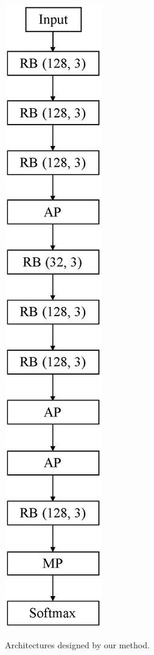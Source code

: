 \begin{figure}[!t]
\begin{minipage}[b]{0.45\linewidth}
  \label{modelA}
 \end{minipage}
 \begin{minipage}[b]{0.45\linewidth}
  \centering
  \includegraphics[keepaspectratio, scale=0.4]{images/modelB.eps}
  \label{modelB}
 \end{minipage}
 \caption{Architectures designed by our method.}\label{models}
\end{figure}

